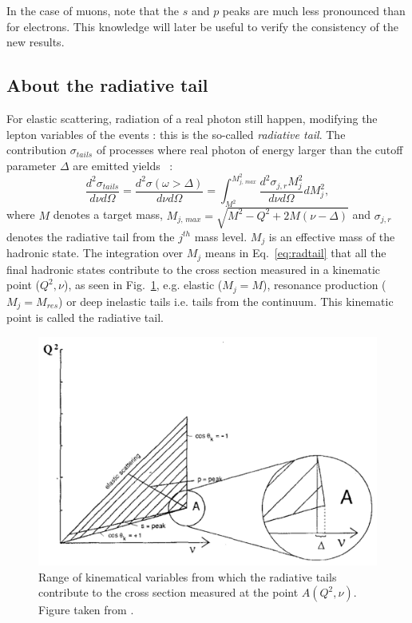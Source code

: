 In the case of muons, note that the $s$ and $p$ peaks are much less pronounced than for electrons. This knowledge will later be useful to verify the consistency of the new results.

\subsection{About the radiative tail}

For elastic scattering, radiation of a real photon still happen, modifying the lepton variables of the events : this is the so-called \textit{radiative tail}. The contribution $\sigma_{tails}$ of processes where real photon of energy larger than the cutoff parameter $\Delta$ are emitted yields \cite{TERAD2}~:
%
\begin{equation}\label{eq:radtail}
    \frac{d^2 \sigma_{tails}}{d\nu d\Omega} = \frac{d^2 \sigma(\omega > \Delta)}{d\nu d\Omega} = \int_{M^{2}}^{M^{2}_{j,\,max}} \frac{d^2 \sigma_{j,r} M^{2}_{j}}{d\nu d\Omega} dM^{2}_{j},
\end{equation}
%
where $M$ denotes a target mass, $M_{j,\,max} = \sqrt{M^2-Q^2+2M(\nu-\Delta)}$ and $\sigma_{j,r}$ denotes the radiative tail from the $j^{th}$ mass level. $M_{j}$ is an effective mass of the hadronic state. The integration over $M_j$ means in Eq.~\ref{eq:radtail} that all the final hadronic states contribute to the cross section measured in a kinematic point ($Q^2,\nu$), as seen in Fig.~\ref{fig:peaks}, e.g. elastic ($M_j=M$), resonance production ($M_j=M_{res}$) or deep inelastic tails i.e. tails from the continuum. This kinematic point is called the radiative tail.

\begin{figure}[h!]
\centering
\includegraphics[width=12cm]{gfx/peaks.png}
\caption{Range of kinematical variables from which the radiative tails contribute to the cross section
measured at the point $A(Q^2, \nu)$. Figure taken from \cite{TERAD2}.}
\label{fig:peaks}
\end{figure}


